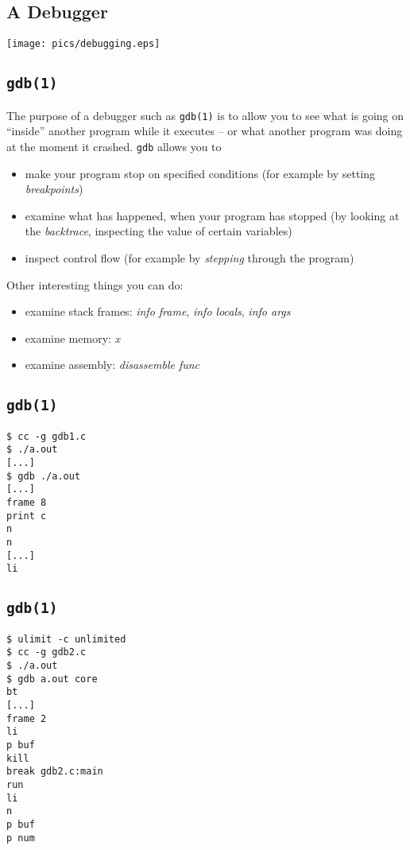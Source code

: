 \documentclass[xga]{xdvislides}
\begin{document}
\subsection{A Debugger}
\vspace*{\fill}
\begin{center}
	\texttt{[image: pics/debugging.eps]}
\end{center}
\vspace*{\fill}

\subsection{{\tt gdb(1)}}

The purpose of a debugger such as {\tt gdb(1)} is to allow you to see what is
going on ``inside'' another program while it executes -- or what another
program was doing at the moment it crashed. {\tt gdb} allows you to

\begin{itemize}
	\item make your program stop on specified conditions (for example by
		setting {\em breakpoints})
	\item examine what has happened, when your program has stopped (by looking
		at the {\em backtrace}, inspecting the value of certain variables)
	\item inspect control flow (for example by {\em stepping} through the
		program)
\end{itemize}
\vspace{.25in}
Other interesting things you can do:

\begin{itemize}
	\item examine stack frames: {\em info frame}, {\em info locals}, {\em info
		args}
	\item examine memory: {\em x}
	\item examine assembly: {\em disassemble func}
\end{itemize}

\subsection{{\tt gdb(1)}}
\begin{verbatim}
$ cc -g gdb1.c
$ ./a.out
[...]
$ gdb ./a.out
[...]
frame 8
print c
n
n
[...]
li

\end{verbatim}

\subsection{{\tt gdb(1)}}
\begin{verbatim}
$ ulimit -c unlimited
$ cc -g gdb2.c
$ ./a.out
$ gdb a.out core
bt
[...]
frame 2
li
p buf
kill
break gdb2.c:main
run
li
n
p buf
p num
\end{verbatim}
\end{document}
